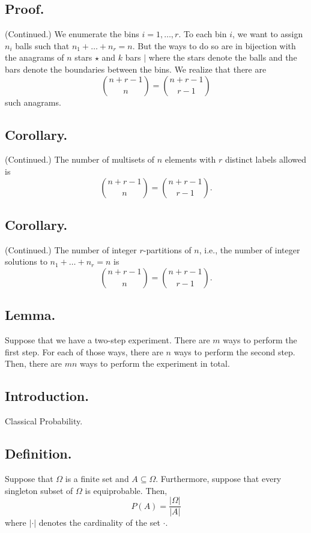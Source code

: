 \documentclass[titlepage]{article}
\begin{document}
\subsection{Proof.} (Continued.) We enumerate the bins $i = 1, \ldots, r$. To each bin $i$, we want to assign $n_{i}$ balls such that $n_{1} + \ldots + n_{r} = n$. But the ways to do so are in bijection with the anagrams of $n$ stars $\star$ and $k$ bars $\vert$ where the stars denote the balls and the bars denote the boundaries between the bins. We realize that there are 
$$\binom{n+r-1}{n} = \binom{n+r-1}{r-1}$$
such anagrams.

\subsection{Corollary.} (Continued.) The number of multisets of $n$ elements with $r$ distinct labels allowed is 
$$\binom{n+r-1}{n} = \binom{n+r-1}{r-1}.$$

\subsection{Corollary.} (Continued.) The number of integer $r$-partitions of $n$, i.e., the number of integer solutions to $n_{1} + \ldots + n_{r} = n$ is 
$$\binom{n+r-1}{n} = \binom{n+r-1}{r-1}.$$

\subsection{Lemma.} Suppose that we have a two-step experiment. There are $m$ ways to perform the first step. For each of those ways, there are $n$ ways to perform the second step. Then, there are $mn$ ways to perform the experiment in total.

\newpage {}

\subsection{Introduction.} Classical Probability.

\subsection{Definition.} Suppose that $\Omega$ is a finite set and $A \subseteq \Omega$. Furthermore, suppose that every singleton subset of $\Omega$ is equiprobable. Then, 
$$P(A) = \frac{|\Omega|}{|A|}$$
where $|\cdot|$ denotes the cardinality of the set $\cdot$.
\end{document}
